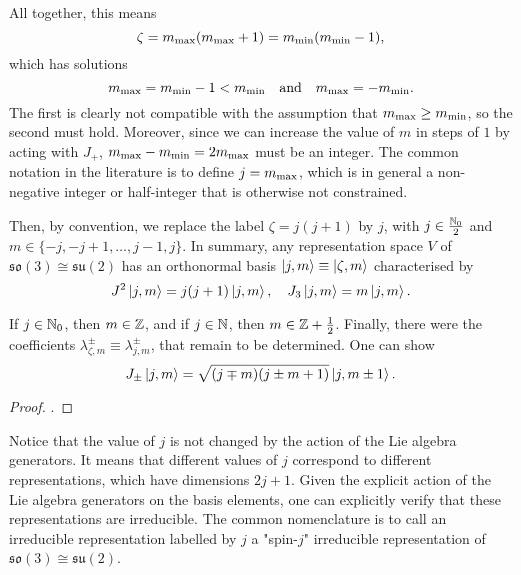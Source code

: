 All together, this means
\begin{equation}
    \zeta = m_\textup{max} (m_\textup{max} + 1) = m_\textup{min} (m_\textup{min} - 1),
\end{equation}
which has solutions
\begin{equation*}
    m_\textup{max} = m_\textup{min} - 1 < m_\textup{min} \quad \textup{and} \quad m_\textup{max} = - m_\textup{min}.
\end{equation*}
The first is clearly not compatible with the assumption that $m_\textup{max} \geq m_\textup{min}$, so the second must hold. Moreover, since we can increase the value of $m$ in steps of $1$ by acting with $J_+$, $m_\textup{max} - m_\textup{min} = 2 m_\textup{max}$ must be an integer. The common notation in the literature is to define $j = m_\textup{max}$, which is in general a non-negative integer or half-integer that is otherwise not constrained.

Then, by convention, we replace the label $\zeta = j (j+1)$ by $j$, with $j \in \frac{\mathbb{N}_0}{2}$ and $m \in \{ -j, -j+1, \dots, j-1, j \}$. In summary, any representation space $V$ of $\mathfrak{so}(3) \cong \mathfrak{su}(2)$ has an orthonormal basis $\ket{j,m} \equiv \ket{\zeta, m}$ characterised by
\begin{equation}
    J^2 \ket{j,m} = j(j+1) \ket{j,m}, \quad J_3 \ket{j,m} = m \ket{j,m} .
\end{equation}

If $j \in \mathbb{N}_0$, then $m \in \mathbb{Z}$, and if $j \in \mathbb{N}$, then $m \in \mathbb{Z} + \frac{1}{2}$. Finally, there were the coefficients $\lambda^\pm_{\zeta, m} \equiv \lambda^\pm_{j,m}$, that remain to be determined. One can show
\begin{equation}
    J_\pm \ket{j,m} = \sqrt{(j \mp m)(j \pm m + 1)} \ket{j,m \pm 1} .
\end{equation}
\begin{proof}
    .
\end{proof}

Notice that the value of $j$ is not changed by the action of the Lie algebra generators. It means that different values of $j$ correspond to different representations, which have dimensions $2j +1$. Given the explicit action of the Lie algebra generators on the basis elements, one can explicitly verify that these representations are irreducible. The common nomenclature is to call an irreducible representation labelled by $j$ a "spin-$j$" irreducible representation of $\mathfrak{so}(3) \cong \mathfrak{su}(2)$.

